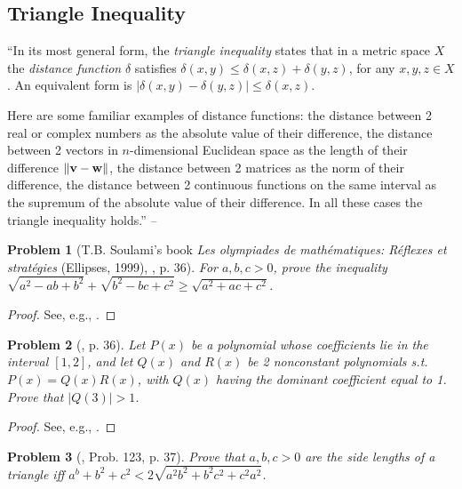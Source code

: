 \documentclass[oneside]{book}
\numberwithin{equation}{section}
\newtheorem{problem}{Problem}[section]
\begin{document}
\subsection{Triangle Inequality}
``In its most general form, the \textit{triangle inequality} states that in a metric space $X$ the \textit{distance function} $\delta$ satisfies $\delta(x,y)\le\delta(x,z) + \delta(y,z)$, for any $x,y,z\in X$. An equivalent form is $|\delta(x,y) - \delta(y,z)|\le\delta(x,z)$.

Here are some familiar examples of distance functions: the distance between 2 real or complex numbers as the absolute value of their difference, the distance between 2 vectors in $n$-dimensional Euclidean space as the length of their difference $\|{\bf v} - {\bf w}\|$, the distance between 2 matrices as the norm of their difference, the distance between 2 continuous functions on the same interval as the supremum of the absolute value of their difference. In all these cases the triangle inequality holds.'' -- \cite[Subsect. 2.1.4, p. 35]{Gelca_Andreescu2017}

\begin{problem}[T.B. Soulami's book \textit{Les olympiades de math\'ematiques: Réflexes et strat\'egies} (Ellipses, 1999), \cite{Gelca_Andreescu2017}, p. 36]
	For $a,b,c > 0$, prove the inequality $\sqrt{a^2 - ab + b^2} + \sqrt{b^2 - bc + c^2}\ge\sqrt{a^2 + ac + c^2}$.
\end{problem}

\begin{proof}[Proof]
	See, e.g., \cite[p. 36]{Gelca_Andreescu2017}.
\end{proof}

\begin{problem}[\cite{Gelca_Andreescu2017}, p. 36]
	Let $P(x)$ be a polynomial whose coefficients lie in the interval $[1,2]$, and let $Q(x)$ and $R(x)$ be 2 nonconstant polynomials s.t. $P(x) = Q(x)R(x)$, with $Q(x)$ having the dominant coefficient equal to 1. Prove that $|Q(3)| > 1$.
\end{problem}

\begin{proof}[Proof]
	See, e.g., \cite[pp. 36--37]{Gelca_Andreescu2017}.
\end{proof}

\begin{problem}[\cite{Gelca_Andreescu2017}, Prob. 123, p. 37]
	Prove that $a,b,c > 0$ are the side lengths of a triangle iff $a^b + b^2 + c^2 < 2\sqrt{a^2b^2 + b^2c^2 + c^2a^2}$.
\end{problem}
\end{document}
